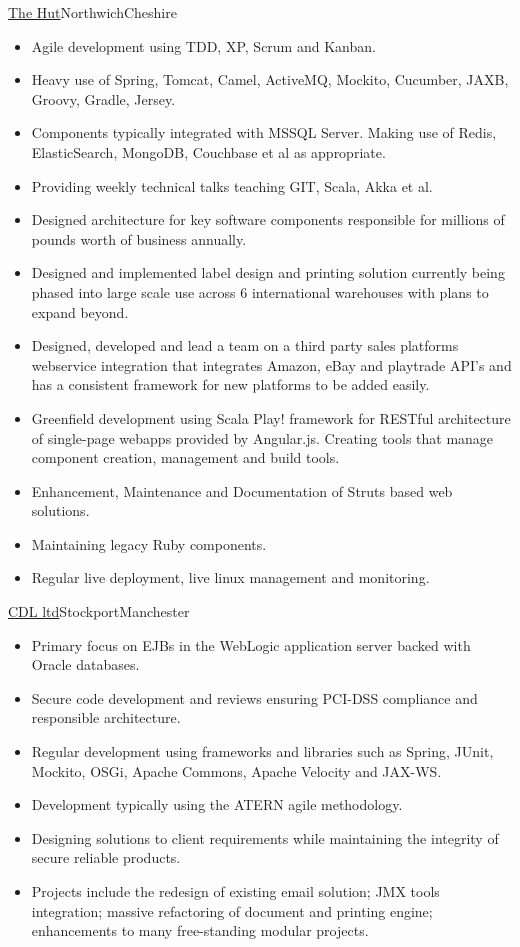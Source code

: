 \documentclass[a4paper,10pt]{moderncv}
\newcommand\weblink[2] {{\color{href} \href{#1}{#2}}}
\begin{document}
{\weblink{http://www.thehutgroup.com}{The Hut}}{Northwich}{Cheshire}{
\begin{itemize}
  \item Agile development using TDD, XP, Scrum and Kanban.
  \item Heavy use of Spring, Tomcat, Camel, ActiveMQ, Mockito, Cucumber, JAXB, Groovy, Gradle, Jersey.
  \item Components typically integrated with MSSQL Server. Making use of Redis, ElasticSearch, MongoDB, Couchbase et al as appropriate.
  \item Providing weekly technical talks teaching GIT, Scala, Akka et al.
  \item Designed architecture for key software components responsible for millions of pounds worth of business annually.
  \item Designed and implemented label design and printing solution currently being phased into large scale use across 6 international warehouses with plans to expand beyond.
  \item Designed, developed and lead a team on a third party sales platforms webservice integration that integrates Amazon, eBay and playtrade API's and has a consistent framework for new platforms to be added easily.
  \item Greenfield development using Scala Play! framework for RESTful architecture of single-page webapps provided by Angular.js. Creating tools that manage component creation, management and build tools.
  \item Enhancement, Maintenance and Documentation of Struts based web solutions.
  \item Maintaining legacy Ruby components.
  \item Regular live deployment, live linux management and monitoring.
\end{itemize}
}

{\weblink{http://www.cdl.co.uk}{CDL ltd}}{Stockport}{Manchester}{
\begin{itemize}
  \item Primary focus on EJBs in the WebLogic application server backed with Oracle databases.
  \item Secure code development and reviews ensuring PCI-DSS compliance and responsible architecture.
  \item Regular development using frameworks and libraries such as Spring, JUnit, Mockito, OSGi, Apache Commons, Apache Velocity and JAX-WS.
  \item Development typically using the ATERN agile methodology.
  \item Designing solutions to client requirements while maintaining the integrity of secure reliable products.
  \item Projects include the redesign of existing email solution; JMX tools integration; massive refactoring of document and printing engine; enhancements to many free-standing modular projects.
\end{itemize}
}
\end{document}
